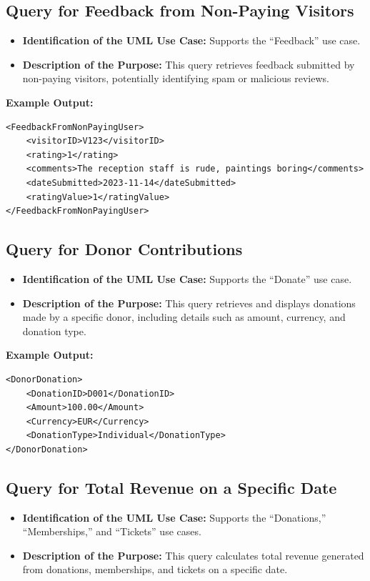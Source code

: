 \documentclass{article} %
\begin{document}
\subsection{Query for Feedback from Non-Paying Visitors}
\begin{itemize}
    \item \textbf{Identification of the UML Use Case:} Supports the ``Feedback'' use case.
    \item \textbf{Description of the Purpose:} This query retrieves feedback submitted by non-paying visitors, potentially identifying spam or malicious reviews.
\end{itemize}

\textbf{Example Output:}
\begin{verbatim}
<FeedbackFromNonPayingUser>
    <visitorID>V123</visitorID>
    <rating>1</rating>
    <comments>The reception staff is rude, paintings boring</comments>
    <dateSubmitted>2023-11-14</dateSubmitted>
    <ratingValue>1</ratingValue>
</FeedbackFromNonPayingUser>
\end{verbatim}

\subsection{Query for Donor Contributions}
\begin{itemize}
    \item \textbf{Identification of the UML Use Case:} Supports the ``Donate'' use case.
    \item \textbf{Description of the Purpose:} This query retrieves and displays donations made by a specific donor, including details such as amount, currency, and donation type.
\end{itemize}

\textbf{Example Output:}
\begin{verbatim}
<DonorDonation>
    <DonationID>D001</DonationID>
    <Amount>100.00</Amount>
    <Currency>EUR</Currency>
    <DonationType>Individual</DonationType>
</DonorDonation>
\end{verbatim}

\subsection{Query for Total Revenue on a Specific Date}
\begin{itemize}
    \item \textbf{Identification of the UML Use Case:} Supports the ``Donations,'' ``Memberships,'' and ``Tickets'' use cases.
    \item \textbf{Description of the Purpose:} This query calculates total revenue generated from donations, memberships, and tickets on a specific date.
\end{itemize}
\end{document}

